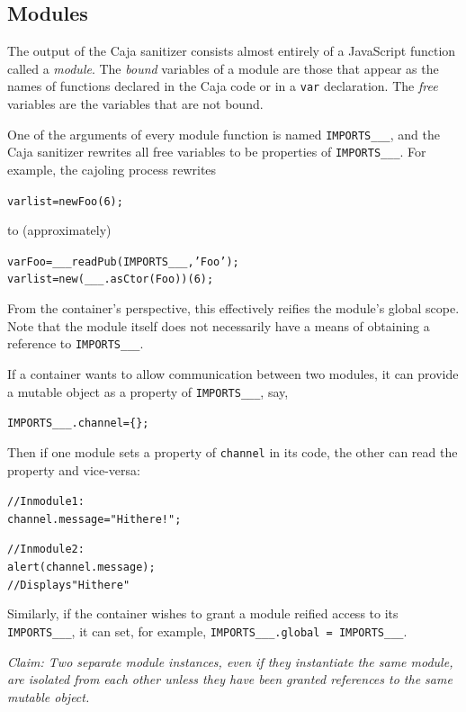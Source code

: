 \documentclass[letterpaper,twocolumn,10pt]{article}
\newcommand{\code}[1]{{\tt {#1}}}              %
\begin{document}
\subsection{Modules}
\label{subsec:outer-env}

The output of the Caja sanitizer consists almost entirely of a JavaScript function 
called a \emph{module}.  The \emph{bound} variables of a module are those that appear as the names of
functions declared in the Caja code or in a \code{var} declaration.  The \emph{free}
variables are the variables that are not bound.  

One of the arguments of every module function is named \code{IMPORTS\_\_\_}, and the 
Caja sanitizer rewrites all free variables to be properties of \code{IMPORTS\_\_\_}.  
For example, the cajoling process rewrites
\begin{alltt}
var list = new Foo(6);
\end{alltt}
to (approximately)
\begin{alltt}
var Foo = ___readPub(IMPORTS\_\_\_, 'Foo');
var list = new (___.asCtor(Foo))(6);
\end{alltt}
From the container's perspective, this effectively reifies the module's global scope.
Note that the module itself does not necessarily have a means of obtaining a reference 
to \code{IMPORTS\_\_\_}.

If a container wants to allow communication between two modules, it can provide
a mutable object as a property of \code{IMPORTS\_\_\_}, say, 
\begin{alltt}
IMPORTS\_\_\_.channel = \{\};
\end{alltt}
Then if one module sets a property of \code{channel} in its code, the other can read
the property and vice-versa:
\begin{alltt}
// In module 1:
channel.message = "Hi there!";

// In module 2:
alert(channel.message);
// Displays "Hi there"
\end{alltt}

Similarly, if the container wishes to grant a module reified access to its \code{IMPORTS\_\_\_},
it can set, for example, \code{IMPORTS\_\_\_.global = IMPORTS\_\_\_}.

\emph{Claim: Two separate module instances, even if they instantiate the same module, 
are isolated from each other unless they have been granted references to the same mutable object.}
\end{document}
